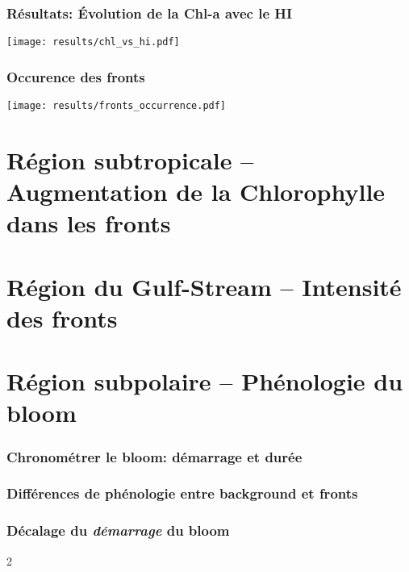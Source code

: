 
\begin{frame}
  \frametitle{Résultats: Évolution de la Chl-a avec le HI}
  \texttt{[image: results/chl\_vs\_hi.pdf]}
\end{frame}

\begin{frame}
  \frametitle{Occurence des fronts}
  \texttt{[image: results/fronts\_occurrence.pdf]}

  \vfill

  \begin{block}{}

  \end{block}

\end{frame}

\section{Région subtropicale -- Augmentation de la Chlorophylle dans les fronts}

\section{Région du Gulf-Stream -- Intensité des fronts}

\section{Région subpolaire -- Phénologie du bloom}


\begin{frame}
  \frametitle{Chronométrer le bloom: démarrage et durée}
\end{frame}


\begin{frame}
  \frametitle{Différences de phénologie entre background et fronts}
\end{frame}


\begin{frame}
  \frametitle{Décalage du \emph{\textit{démarrage}} du bloom}

  \vfill

  \begin{overlayarea}{\textwidth}{2\baselineskip}

  \end{overlayarea}
\end{frame}


